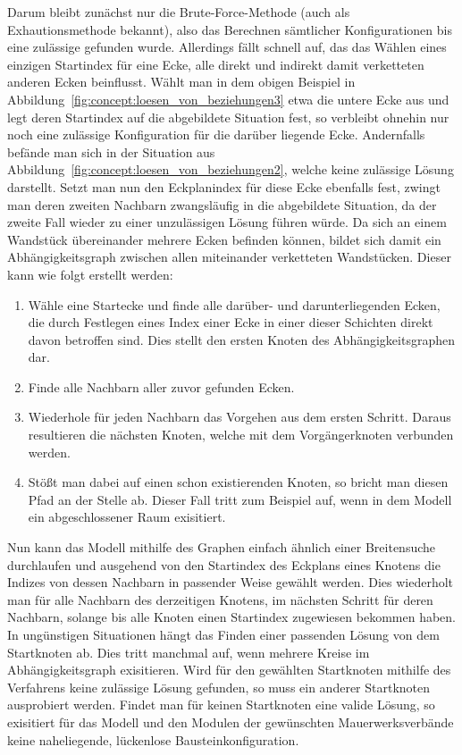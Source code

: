 Darum bleibt zunächst nur die Brute-Force-Methode (auch als Exhautionsmethode bekannt), also das Berechnen sämtlicher Konfigurationen bis eine zulässige gefunden wurde.
Allerdings fällt schnell auf, das das Wählen eines einzigen Startindex für eine Ecke, alle direkt und indirekt damit verketteten anderen Ecken beinflusst.
Wählt man in dem obigen Beispiel in Abbildung~\ref{fig:concept:loesen_von_beziehungen3} etwa die untere Ecke aus und legt deren Startindex auf die abgebildete Situation fest, so verbleibt ohnehin nur noch eine zulässige Konfiguration für die darüber liegende Ecke.
Andernfalls befände man sich in der Situation aus Abbildung~\ref{fig:concept:loesen_von_beziehungen2}, welche keine zulässige Lösung darstellt.
Setzt man nun den Eckplanindex für diese Ecke ebenfalls fest, zwingt man deren zweiten Nachbarn zwangsläufig in die abgebildete Situation, da der zweite Fall wieder zu einer unzulässigen Lösung führen würde.
Da sich an einem Wandstück übereinander mehrere Ecken befinden können, bildet sich damit ein Abhängigkeitsgraph zwischen allen miteinander verketteten Wandstücken.
Dieser kann wie folgt erstellt werden:

\begin{enumerate}
    \item Wähle eine Startecke und finde alle darüber- und darunterliegenden Ecken, die durch Festlegen eines Index einer Ecke in einer dieser Schichten direkt davon betroffen sind. Dies stellt den ersten Knoten des Abhängigkeitsgraphen dar.
    \item Finde alle Nachbarn aller zuvor gefunden Ecken.
    \item Wiederhole für jeden Nachbarn das Vorgehen aus dem ersten Schritt. Daraus resultieren die nächsten Knoten, welche mit dem Vorgängerknoten verbunden werden.
    \item Stößt man dabei auf einen schon existierenden Knoten, so bricht man diesen Pfad an der Stelle ab. Dieser Fall tritt zum Beispiel auf, wenn in dem Modell ein abgeschlossener Raum exisitiert.
\end{enumerate}

Nun kann das Modell mithilfe des Graphen einfach ähnlich einer Breitensuche durchlaufen und ausgehend von den Startindex des Eckplans eines Knotens die Indizes von dessen Nachbarn in passender Weise gewählt werden.
Dies wiederholt man für alle Nachbarn des derzeitigen Knotens, im nächsten Schritt für deren Nachbarn, solange bis alle Knoten einen Startindex zugewiesen bekommen haben.
In ungünstigen Situationen hängt das Finden einer passenden Lösung von dem Startknoten ab.
Dies tritt manchmal auf, wenn mehrere Kreise im Abhängigkeitsgraph exisitieren.
Wird für den gewählten Startknoten mithilfe des Verfahrens keine zulässige Lösung gefunden, so muss ein anderer Startknoten ausprobiert werden.
Findet man für keinen Startknoten eine valide Lösung, so exisitiert für das Modell und den Modulen der gewünschten Mauerwerksverbände keine naheliegende, lückenlose Bausteinkonfiguration.

